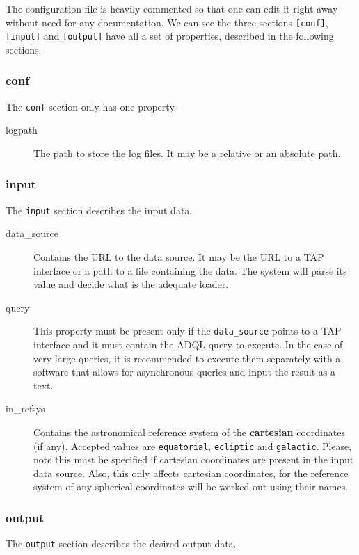\documentclass[
a4paper, %
11pt, %
onecolumn, %
openany, %
]{memoir}
\begin{document}
The configuration file is heavily commented so that one can edit it right away without need for any
documentation.
We can see the three sections \texttt{[conf]}, \texttt{[input]} and \texttt{[output]} have all a
set of properties, described in the following sections.

\subsubsection{conf}
The \texttt{conf} section only has one property.
\begin{description}
\item[logpath] The path to store the log files. It may be a relative or an absolute path.
\end{description}

\subsubsection{input}
The \texttt{input} section describes the input data.

\begin{description}
\item[data\_source] Contains the URL to the data source. It may be the URL to a TAP interface or a path to a file containing the
data. The system will parse its value and decide what is the adequate loader.
\item[query] This property must be present only if the \texttt{data\_source} points to a TAP interface and it must contain the
ADQL query to execute. In the case of very large queries, it is recommended to execute them separately with a software that
allows for asynchronous queries and input the result as a text.
\item[in\_refsys] Contains the astronomical reference system of the \textbf{cartesian} coordinates (if any). Accepted
values are \texttt{equatorial}, \texttt{ecliptic} and \texttt{galactic}. Please, note this must be specified if cartesian coordinates
are present in the input data source. Also, this only affects cartesian coordinates, for the reference system of any spherical coordinates will be
worked out using their names.
\end{description}

\subsubsection{output}
The \texttt{output} section describes the desired output data.
\end{document}
